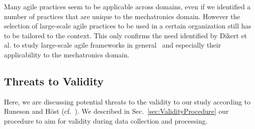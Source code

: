 \documentclass[10pt,a4paper]{IEEEtran} %
\begin{document}
\begin{comment}
Topics that have been mentioned (even from references) that are similar to our findings:

Risk factors:
\begin{itemize}
\item ``The customer representative cannot be always available and present alongside the development process''
\item ``Outsourcing and/or subcontracting is likely to be more difficult to manage (Turk et al., 2002)''
\item ``Limited or unsustainable support for development involving large teams is likely to occur (Turk et al., 2002)''
\item ``Limited supported for developing safety-critical software is likely to occur (Turk et al., 2002)''
\item ``Limited support for developing large, complex software is likely to occur (Turk et al., 2002; Dybå and Dingsøyr, 2008)''
\end{itemize}
\end{comment}

\begin{comment}
``Quantitatively measuring a large-scale agile transformation'' (\url{http://www.sciencedirect.com/science/article/pii/S016412121600087X})
\cite{olszewska_nee_plaska_quantitatively_2016}
\end{comment}




Many agile practices seem to be applicable across domains, even if we identified a number of practices that are unique to the mechatronics domain. However the selection of large-scale agile practices to be used in a certain organization still has to be tailored to the context. This only confirms the need identified by Dikert et al. to study large-scale agile frameworks in general~\cite{dikert_challenges_2016} and especially their applicability to the mechatronics domain.


\subsection{Threats to Validity}
\label{sec:ThreatsToValidity}

Here, we are discussing potential threats to the validity to our study according to
Runeson and Höst (cf.~\cite{runeson_guidelines_2009}). We described in 
Sec.~\ref{sec:ValidityProcedure} our procedure to aim for validity during data collection and processing.
\end{document}
